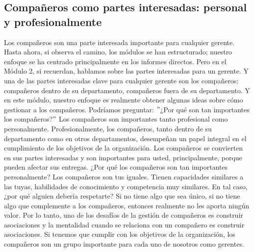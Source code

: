 \documentclass[10pt]{book}
\begin{document}
\subsection{Compañeros como partes interesadas: personal y profesionalmente}
Los compañeros son una parte interesada importante para cualquier gerente. Hasta ahora, si observa el camino, los módulos se han estructurado; nuestro enfoque se ha centrado principalmente en los informes directos. Pero en el Módulo 2, si recuerdan, hablamos sobre las partes interesadas para un gerente. Y una de las partes interesadas clave para cualquier gerente son los compañeros: compañeros dentro de su departamento, compañeros fuera de su departamento. Y en este módulo, nuestro enfoque es realmente obtener algunas ideas sobre cómo gestionar a los compañeros. Podríamos preguntar: $"$¿Por qué son tan importantes los compañeros?$"$ Los compañeros son importantes tanto profesional como personalmente. Profesionalmente, los compañeros, tanto dentro de su departamento como en otros departamentos, desempeñan un papel integral en el cumplimiento de los objetivos de la organización. Los compañeros se convierten en sus partes interesadas y son importantes para usted, principalmente, porque pueden afectar sus entregas. ¿Por qué los compañeros son tan importantes personalmente? Los compañeros son tus iguales. Tienen capacidades similares a las tuyas, habilidades de conocimiento y competencia muy similares. En tal caso, ¿por qué alguien debería respetarte? Si no tiene algo que sea único, si no tiene algo que complemente a los compañeros, entonces realmente no les aporta ningún valor. Por lo tanto, uno de los desafíos de la gestión de compañeros es construir asociaciones y la mentalidad cuando se relaciona con un compañero es construir asociaciones. Si tenemos que cumplir con los objetivos de la organización, los compañeros son un grupo importante para cada uno de nosotros como gerentes.
\end{document}
